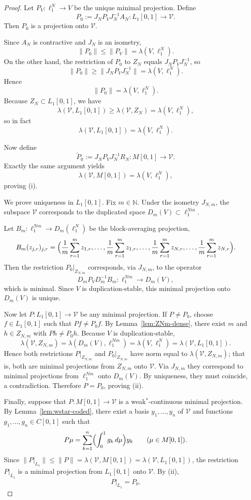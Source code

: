 \documentclass[11pt]{amsart}
\numberwithin{equation}{section}
\theoremstyle{definition}
\theoremstyle{remark}
\newcommand{\N}{\mathbb N}
\begin{document}
\begin{proof}
Let $P_V\colon \ell_1^N\to V$ be the unique minimal projection. Define
\[
P_0 := J_N P_V J_N^{-1} A_N\colon L_1[0,1]\to \mathscr V.
\]
Then $P_0$ is a projection onto $\mathscr V$.

Since $A_N$ is contractive and $J_N$ is an isometry,
\[
\|P_0\|\leqslant \|P_V\| = \lambda(V,\ell_1^N).
\]
On the other hand, the restriction of $P_0$ to $Z_N$ equals $J_NP_VJ_N^{-1}$, so
\[
\|P_0\|\geqslant \|J_NP_VJ_N^{-1}\| = \lambda(V,\ell_1^N).
\]
Hence
\[
\|P_0\| = \lambda(V,\ell_1^N).
\]
Because $Z_N\subset L_1[0,1]$, we have
\[
\lambda(\mathscr V,L_1[0,1]) \geqslant \lambda(\mathscr V,Z_N)=\lambda(V,\ell_1^N),
\]
so in fact
\[
\lambda(\mathscr V,L_1[0,1]) = \lambda(V,\ell_1^N).
\]

Now define
\[
\widetilde P_0 := J_N P_V J_N^{-1} R_N\colon M[0,1]\to \mathscr V.
\]
Exactly the same argument yields
\[
\lambda(\mathscr V,M[0,1]) = \lambda(V,\ell_1^N),
\]
proving \textup{(i)}.

We prove uniqueness in $L_1[0,1]$. Fix $m\in\N$. Under the isometry $J_{N,m}$, the subspace $\mathscr V$ corresponds to the duplicated space $D_m(V)\subset \ell_1^{Nm}$.

Let $B_m\colon \ell_1^{Nm}\to D_m(\ell_1^N)$ be the block-averaging projection,
\[
B_m(z_{j,r})_{j,r} = \Bigl(\frac1m\sum_{r=1}^m z_{1,r},\dots,\frac1m\sum_{r=1}^m z_{1,r},\dots,
\frac1m\sum_{r=1}^m z_{N,r},\dots,\frac1m\sum_{r=1}^m z_{N,r}\Bigr).
\]
Then the restriction $P_0|_{Z_{N,m}}$ corresponds, via $J_{N,m}$, to the operator
\[
D_m P_V D_m^{-1} B_m\colon \ell_1^{Nm}\to D_m(V),
\]
which is minimal. Since $V$ is duplication-stable, this minimal projection onto $D_m(V)$ is unique.

Now let $P\colon L_1[0,1]\to \mathscr V$ be any minimal projection. If $P\neq P_0$, choose $f\in L_1[0,1]$ such that $Pf\neq P_0f$. By Lemma~\ref{lem:ZNm-dense}, there exist $m$ and $h\in Z_{N,m}$ with $Ph\neq P_0h$. Because $V$ is duplication-stable,
\[
\lambda(\mathscr V,Z_{N,m}) = \lambda(D_m(V),\ell_1^{Nm}) = \lambda(V,\ell_1^N)=\lambda(\mathscr V,L_1[0,1]).
\]
Hence both restrictions $P|_{Z_{N,m}}$ and $P_0|_{Z_{N,m}}$ have norm equal to $\lambda(\mathscr V,Z_{N,m})$; that is, both are minimal projections from $Z_{N,m}$ onto $\mathscr V$. Via $J_{N,m}$ they correspond to minimal projections from $\ell_1^{Nm}$ onto $D_m(V)$. By uniqueness, they must coincide, a contradiction. Therefore $P=P_0$, proving \textup{(ii)}.

Finally, suppose that $P\colon M[0,1]\to \mathscr V$ is a weak$^*$-continuous minimal projection. By Lemma~\ref{lem:wstar-coded}, there exist a basis $y_1,\dots,y_n$ of $\mathscr V$ and functions $g_1,\dots,g_n\in C[0,1]$ such that
\[
P\mu = \sum_{k=1}^n \Bigl(\int_0^1 g_k\, d\mu\Bigr) y_k
\qquad (\mu\in M[0,1]).
\]
Since $\|P|_{L_1}\|\leqslant \|P\| = \lambda(\mathscr V,M[0,1]) = \lambda(\mathscr V,L_1[0,1])$, the restriction $P|_{L_1}$ is a minimal projection from $L_1[0,1]$ onto $\mathscr V$. By \textup{(ii)},
\[
P|_{L_1} = P_0.
\]


\end{proof}
\end{document}
